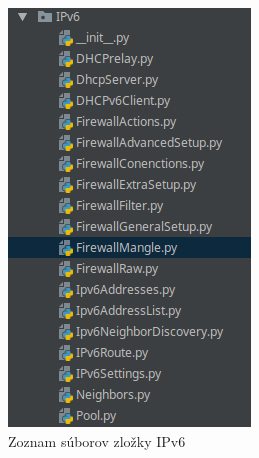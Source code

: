 \begin{figure}[H]
\centering
\includegraphics[scale=0.6]{../text/IPV6.png}
\caption{Zoznam súborov zložky IPv6}
\label{fig:ipv6}
\end{figure}
